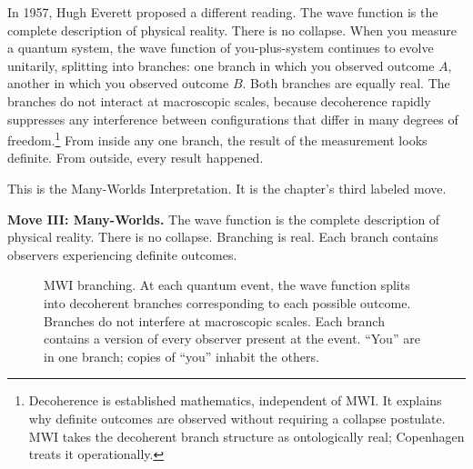 In 1957, Hugh Everett proposed a different reading. The wave function is the complete description of physical reality. There is no collapse. When you measure a quantum system, the wave function of you-plus-system continues to evolve unitarily, splitting into branches: one branch in which you observed outcome $A$, another in which you observed outcome $B$. Both branches are equally real. The branches do not interact at macroscopic scales, because decoherence rapidly suppresses any interference between configurations that differ in many degrees of freedom.\footnote{Decoherence is established mathematics, independent of MWI. It explains why definite outcomes are observed without requiring a collapse postulate. MWI takes the decoherent branch structure as ontologically real; Copenhagen treats it operationally.} From inside any one branch, the result of the measurement looks definite. From outside, every result happened.

This is the Many-Worlds Interpretation. It is the chapter's third labeled move.

\textbf{Move III: Many-Worlds.} The wave function is the complete description of physical reality. There is no collapse. Branching is real. Each branch contains observers experiencing definite outcomes.

\begin{figure}[h]
\centering
{}
\caption{MWI branching. At each quantum event, the wave function splits into decoherent branches corresponding to each possible outcome. Branches do not interfere at macroscopic scales. Each branch contains a version of every observer present at the event. ``You'' are in one branch; copies of ``you'' inhabit the others.}
\label{fig:mwi-branching}
\end{figure}

